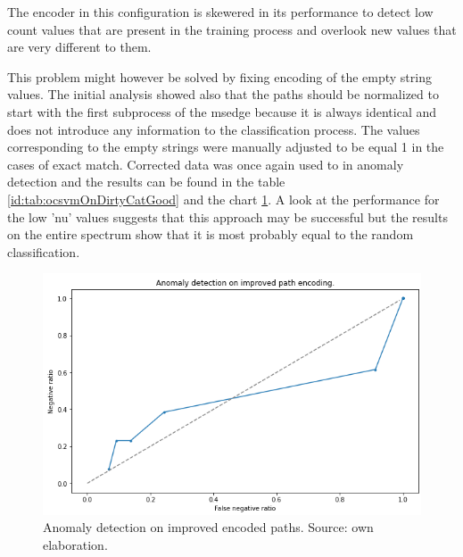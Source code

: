 \documentclass[a4paper,twoside,12pt]{book}
\begin{document}
The encoder in this configuration is skewered in its performance to detect low count values that
are present in the training process and overlook new values that are very different to them. 

This problem might however be solved by fixing encoding of the empty string values. The
initial analysis showed also that the paths should be normalized to start with the first 
subprocess of the msedge because it is always identical and does not introduce any information
to the classification process. The values corresponding to the empty strings were manually adjusted
to be equal 1 in the cases of exact match. Corrected data was once again used to in anomaly detection
and the results can be found in the table \ref{id:tab:ocsvmOnDirtyCatGood} and the chart \ref{fig:ocsvmOnDirtyCatGood}. 
A look at the performance for the low 'nu' values suggests that this approach may be successful but 
the results on the entire spectrum show that it is most probably equal to the random classification.

\begin{figure}
	\centering
	\includegraphics[scale=0.9]{images/OcsvmOnDirtyCatGood}
	\caption{Anomaly detection on improved encoded paths. Source: own elaboration.}
	\label{fig:ocsvmOnDirtyCatGood}
 \end{figure}
\end{document}
